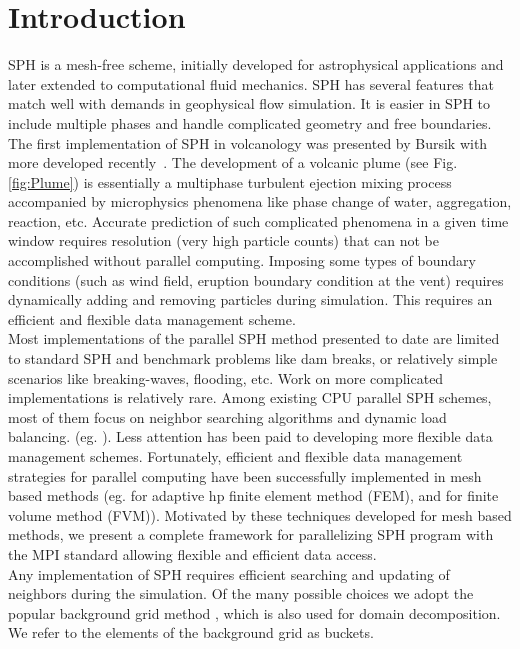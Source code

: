 \documentclass[procedia]{easychair}
\begin{document}
\section{Introduction}
\label{sect:introduction}
SPH is a mesh-free scheme, initially developed for astrophysical applications and later extended to computational fluid mechanics. SPH has several features that match well with demands in geophysical flow simulation. It is easier in SPH to include multiple phases and handle complicated geometry and free boundaries. The first implementation of SPH in volcanology was presented by Bursik \cite{bursik2003smoothed} with more developed recently~\cite{mcdougall2004model, haddad2016smoothed}. The development  of a volcanic plume (see Fig. \ref{fig:Plume}) is essentially a multiphase turbulent ejection mixing process accompanied by microphysics phenomena like phase change of water, aggregation, reaction, etc. Accurate prediction of such complicated phenomena in a given time window requires resolution (very high particle counts) that can not be accomplished without parallel computing. Imposing  some types of boundary conditions (such as wind field, eruption boundary condition at the vent) requires dynamically adding and removing particles during simulation. This requires an efficient and flexible data management scheme.\\
Most implementations of the parallel SPH method presented to date are limited to standard SPH and benchmark problems like dam breaks, or relatively
simple scenarios like breaking-waves, flooding, etc. Work on more complicated implementations is relatively rare. Among existing CPU parallel SPH schemes, most of them focus on neighbor searching algorithms and dynamic load balancing. (eg. \cite{ferrari2009new, crespo2015dualsphysics}). Less attention has been paid to developing more flexible data management schemes. 
Fortunately, efficient and flexible data management strategies for parallel computing have been successfully implemented in mesh based methods (eg. \cite{laszloffy2000simple} for adaptive hp finite element method (FEM), and \cite{patra2005parallel} for finite volume method (FVM)). Motivated by these techniques developed for mesh based methods, we present a complete framework for parallelizing SPH program with the MPI standard allowing flexible and efficient data access.\\
Any implementation of SPH requires efficient searching and updating of neighbors during the simulation. Of the many possible choices we adopt the popular background grid method \cite{monaghan1985refined}, which is also used for domain decomposition. We refer to the elements of the background grid as buckets. 
\end{document}
